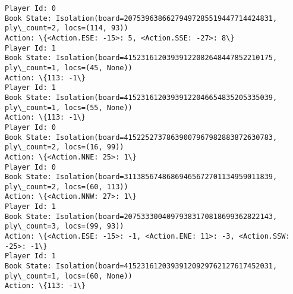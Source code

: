 \documentclass[11pt]{article}
\begin{document}
\begin{Verbatim}[commandchars=\\\{\}]
Player Id: 0
Book State: Isolation(board=20753963866279497285519447714424831, ply\_count=2, locs=(114, 93))
Action: \{<Action.ESE: -15>: 5, <Action.SSE: -27>: 8\}
Player Id: 1
Book State: Isolation(board=41523161203939122082648447852210175, ply\_count=1, locs=(45, None))
Action: \{113: -1\}
Player Id: 1
Book State: Isolation(board=41523161203939122046654835205335039, ply\_count=1, locs=(55, None))
Action: \{113: -1\}
Player Id: 0
Book State: Isolation(board=41522527378639007967982883872630783, ply\_count=2, locs=(16, 99))
Action: \{<Action.NNE: 25>: 1\}
Player Id: 0
Book State: Isolation(board=31138567486869465672701134959011839, ply\_count=2, locs=(60, 113))
Action: \{<Action.NNW: 27>: 1\}
Player Id: 1
Book State: Isolation(board=20753330040979383170818699362822143, ply\_count=3, locs=(99, 93))
Action: \{<Action.ESE: -15>: -1, <Action.ENE: 11>: -3, <Action.SSW: -25>: -1\}
Player Id: 1
Book State: Isolation(board=41523161203939120929762127617452031, ply\_count=1, locs=(60, None))
Action: \{113: -1\}


\end{Verbatim}
\end{document}
